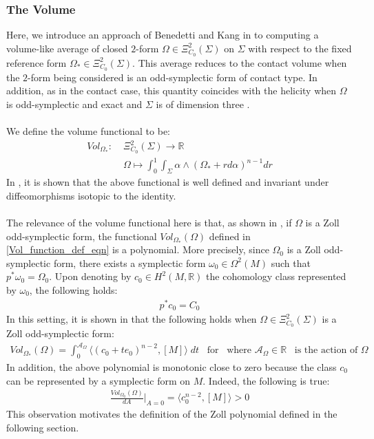 \documentclass[11pt]{amsart}
\theoremstyle{plain}
\theoremstyle{definition}
\theoremstyle{remark}
\begin{document}
\subsubsection{The Volume}\label{volume_section}
Here, we introduce an approach of Benedetti and Kang in \cite{B-K-Odd_Symp} to computing a volume-like average of closed $2$-form $\Omega \in \Xi^2_{C_0}(\Sigma)$ on $\Sigma$ with respect to the fixed reference form $\Omega_* \in \Xi^2_{C_0}(\Sigma)$. This average reduces to the contact volume when the $2$-form being considered is an odd-symplectic form of contact type. In addition, as in the contact case, this quantity coincides with the helicity when $\Omega$ is odd-symplectic and exact and $\Sigma$ is of dimension three \cite[Pg. 331]{B-K-Odd_Symp}.\\
\\
We define the volume functional to be:
\begin{align}\label{Vol_function_def_eqn}
    Vol_{\Omega_*}: \; &\Xi^2_{C_0}(\Sigma) \rightarrow \mathbb{R}\\\nonumber
   &\Omega \mapsto \int^1_0 \int_{\Sigma} \alpha \wedge (\Omega_*+rd\alpha)^{n-1} dr
\end{align}
In \cite{B-K-Odd_Symp}, it is shown that the above functional is well defined and invariant under diffeomorphisms isotopic to the identity.\\
\\
The relevance of the volume functional here is that, as shown in \cite[Theorem 6.14]{B-K-Odd_Symp}, if $\Omega$ is a Zoll odd-symplectic form, the functional $Vol_{\Omega_*}(\Omega)$ defined in \eqref{Vol_function_def_eqn} is a polynomial. More precisely, since $\Omega_0$ is a Zoll odd-symplectic form, there exists a symplectic form $\omega_0 \in \Omega^2(M)$ such that $p^*\omega_0 = \Omega_0$. Upon denoting by $c_0 \in H^2(M,\mathbb{R})$ the cohomology class represented by $\omega_0$, the following holds:
\begin{align}
    p^*c_0 = C_0
\end{align}
In this setting, it is shown in \cite[Theorem 6.14]{B-K-Odd_Symp} that the following holds when $\Omega \in \Xi^2_{C_0}(\Sigma)$ is a Zoll odd-symplectic form:
\begin{align}
    Vol_{\Omega_*}(\Omega) = \int^{\mathcal{A}_{\Omega}}_0 \langle (c_0+te_0)^{n-2},[M] \rangle \; dt \;\;\; \text{for} \;\;\; \text{where } {\mathcal{A}_{\Omega}} \in \mathbb{R}\;\;\; \text{is the action of $\Omega$}
\end{align}
In addition, the above polynomial is monotonic close to zero because the class $c_0$ can be represented by a symplectic form on $M$. Indeed, the following is true:
\begin{align}
     \frac{ Vol_{\Omega_0}(\Omega)}{d A}\Big|_{A=0} = \langle c_0^{n-2}, [M] \rangle >0
\end{align}
This observation motivates the definition of the Zoll polynomial defined in the following section.
\end{document}
